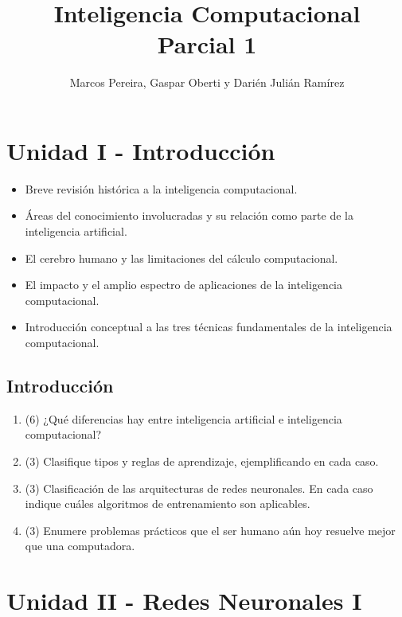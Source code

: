\documentclass[a4paper,10pt,spanish,oneside]{article}
\title{\Huge Inteligencia Computacional\\
Parcial 1}
\author{Marcos Pereira, Gaspar Oberti y Darién Julián Ramírez}
\date{\vspace{-5ex}}
\begin{document}
\maketitle %

\tableofcontents

\newpage

\section{Unidad I - Introducción}

\begin{itemize}
\item Breve revisión histórica a la inteligencia computacional.
\item Áreas del conocimiento involucradas y su relación como parte de la inteligencia artificial.
\item El cerebro humano y las limitaciones del cálculo computacional.
\item El impacto y el amplio espectro de aplicaciones de la inteligencia computacional.
\item Introducción conceptual a las tres técnicas fundamentales de la inteligencia computacional.
\end{itemize}

\subsection{Introducción}

\begin{enumerate}
\item (6) ¿Qué diferencias hay entre inteligencia artificial e inteligencia computacional?

\item (3) Clasifique tipos y reglas de aprendizaje, ejemplificando en cada caso.

\item (3) Clasificación de las arquitecturas de redes neuronales. En cada caso indique cuáles algoritmos de entrenamiento son aplicables.

\item (3) Enumere problemas prácticos que el ser humano aún hoy resuelve mejor que una computadora.
\end{enumerate}

\newpage

\section{Unidad II - Redes Neuronales I}
\end{document}
